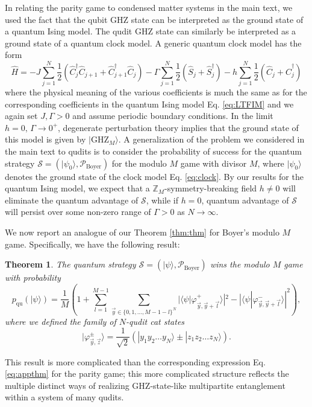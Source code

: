 \documentclass[prb,twocolumn,showpacs,amssymb,superscriptaddress]{revtex4-2}
\newtheorem{theorem}{Theorem}
\begin{document}
In relating the parity game to condensed matter systems in the main text, we used the fact that the qubit GHZ state can be interpreted as the ground state of a quantum Ising model. The qudit GHZ state can similarly be interpreted as a ground state of a quantum clock model. A generic quantum clock model has the form
\begin{equation}
\label{eq:clock}
\hat{H} = -J\sum_{j=1}^N \frac{1}{2}(\hat{C}_j^\dagger \hat{C}_{j+1} +\hat{C}_{j+1}^\dagger \hat{C}_{j}) - \Gamma \sum_{j=1}^N \frac{1}{2}(\hat{S}_j + \hat{S}_j^\dagger) - h \sum_{j=1}^N \frac{1}{2}(\hat{C}_j + \hat{C}_j^\dagger)
\end{equation}
where the physical meaning of the various coefficients is much the same as for the corresponding coefficients in the quantum Ising model Eq. \eqref{eq:LTFIM} and we again set $J, \Gamma >0$ and assume periodic boundary conditions. In the limit $h=0, \, \Gamma \to 0^+$, degenerate perturbation theory implies that the ground state of this model is given by $|\mathrm{GHZ}_M\rangle$. A generalization of the problem we considered in the main text to qudits is to consider the probability of success for the quantum strategy $\mathcal{S} = (|\psi_0\rangle,\mathcal{P}_{\mathrm{Boyer}})$ for the modulo $M$ game with divisor $M$, where $|\psi_0\rangle$ denotes the ground state of the clock model Eq. \eqref{eq:clock}. By our results for the quantum Ising model, we expect that
a $\mathbb{Z}_M$-symmetry-breaking field $h \neq 0$ will eliminate the quantum advantage of $\mathcal{S}$, while if $h=0$, quantum advantage of $\mathcal{S}$ will persist over some non-zero range of $\Gamma>0$ as $N\to \infty$.

We now report an analogue of our Theorem \ref{thm:thm} for Boyer's modulo $M$ game. Specifically, we have the following result:
\begin{theorem}
\label{thm:thm2}
The quantum strategy $\mathcal{S} = (|\psi\rangle,\mathcal{P}_{\mathrm{Boyer}})$ wins the modulo $M$ game with probability
\begin{equation}
\label{eq:quditfidelity}
p_{\mathrm{qu}}(|\psi\rangle) = \frac{1}{M} \left(1 + \sum_{l=1}^{M-1} \sum_{\vec{y} \in \{0,1,\ldots,M-1-l\}^N} |\langle \psi | \varphi^+_{\vec{y},\vec{y}+\vec{l}}\rangle|^2- |\langle \psi | \varphi^-_{\vec{y},\vec{y}+\vec{l}}\rangle|^2\right),
\end{equation}
where we defined the family of $N$-qudit cat states
\begin{equation}
\label{eq:zmcat}
|\varphi^{\pm}_{\vec{y},\vec{z}}\rangle = \frac{1}{\sqrt{2}}(|y_1 y_2\ldots y_N\rangle \pm |z_1 z_2\ldots z_N\rangle).
\end{equation}
\end{theorem}
This result is more complicated than the corresponding expression Eq. \eqref{eq:appthm} for the parity game; this more complicated structure reflects the multiple distinct ways of realizing GHZ-state-like multipartite entanglement within a system of many qudits.
\end{document}
